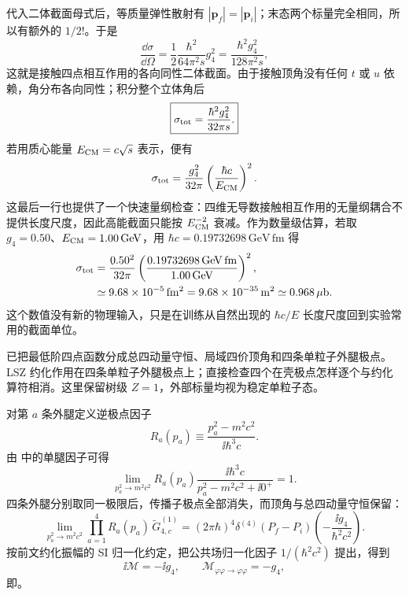 \begin{exbox}
 代入二体截面母式后，等质量弹性散射有 $|\mathbf p_f|=|\mathbf p_i|$；末态两个标量完全相同，所以有额外的 $1/2!$。于是
\begin{equation*}
 \frac{\dd\sigma}{\dd\Omega}
 =\frac12\frac{\hbar^2}{64\pi^2s}g_4^2
 =\frac{\hbar^2g_4^2}{128\pi^2s},
\end{equation*}
这就是接触四点相互作用的各向同性二体截面。由于接触顶角没有任何 $t$ 或 $u$ 依赖，角分布各向同性；积分整个立体角后
\begin{equation}
 \boxed{
 \sigma_{\rm tot}
 =\frac{\hbar^2g_4^2}{32\pi s}.}
 \label{eq:phi4-total-cross-dp64}
\end{equation}
若用质心能量 $E_{\rm CM}=c\sqrt{s}$ 表示，便有
\begin{equation*}
 \sigma_{\rm tot}
 =\frac{g_4^2}{32\pi}
 \left(\frac{\hbar c}{E_{\rm CM}}\right)^2.
\end{equation*}
这最后一行也提供了一个快速量纲检查：四维无导数接触相互作用的无量纲耦合不提供长度尺度，因此高能截面只能按 $E_{\rm CM}^{-2}$ 衰减。作为数量级估算，若取 $g_4=0.50$、$E_{\rm CM}=1.00\,\mathrm{GeV}$，用 $\hbar c=0.19732698\,\mathrm{GeV\,fm}$ 得
\begin{align*}
 \sigma_{\rm tot}
 &=\frac{0.50^2}{32\pi}
 \left(\frac{0.19732698\,\mathrm{GeV\,fm}}{1.00\,\mathrm{GeV}}\right)^2,\\
 &\simeq9.68\times10^{-5}\,\mathrm{fm^2}
 =9.68\times10^{-35}\,\mathrm{m^2}
 \simeq0.968\,\mu\mathrm b.
\end{align*}
这个数值没有新的物理输入，只是在训练从自然出现的 $\hbar c/E$ 长度尺度回到实验常用的截面单位。


\medskip

 已把最低阶四点函数分成总四动量守恒、局域四价顶角和四条单粒子外腿极点。LSZ 约化作用在四条单粒子外腿极点上；直接检查四个在壳极点怎样逐个与约化算符相消。这里保留树级 $Z=1$，外部标量均视为稳定单粒子态。

对第 $a$ 条外腿定义逆极点因子
\[
 R_a(p_a)
 \equiv
 \frac{p_a^2-m^2c^2}{\ii\hbar^3c}.
\]
由 中的单腿因子可得
\[
 \lim_{p_a^2\to m^2c^2}
 R_a(p_a)
 \frac{\ii\hbar^3c}{p_a^2-m^2c^2+\ii0^+}=1.
\]
四条外腿分别取同一极限后，传播子极点全部消失，而顶角与总四动量守恒保留：
\[
 \lim_{p_a^2\to m^2c^2}
 \prod_{a=1}^{4}R_a(p_a)\,
 \widetilde G_{4,c}^{(1)}
 =(2\pi\hbar)^4\delta^{(4)}(P_f-P_i)
 \left(-\frac{\ii g_4}{\hbar^2c^2}\right).
\]
按前文约化振幅的 SI 归一化约定，把公共场归一化因子 $1/(\hbar^2c^2)$ 提出，得到
\[
 \ii\mathcal M=-\ii g_4,
 \qquad
 \mathcal M_{\varphi\varphi\to\varphi\varphi}=-g_4,
\]
即。



\end{exbox}
